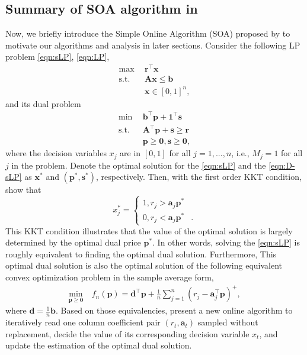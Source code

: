 \documentclass{article} %
\begin{document}
\subsection{Summary of SOA algorithm in \cite{li2020simple}}
\label{sec:soa}
Now, we briefly introduce the Simple Online Algorithm (SOA) proposed by  \cite{li2020simple} to motivate our algorithms and analysis in later sections. Consider the following LP problem \eqref{eqn:sLP}, \eqref{eqn:LP},
\begin{align}
   \tag{sLP} \max \ \ & \bm{r}^\top \bm{x} \label{eqn:sLP}  \\
    \text{s.t. }\ & \bm{A} \bm{x} \le \bm{b} \nonumber  \\ 
    & \bm{x} \in [0,1]^{n},  \nonumber
\end{align}
and its dual problem
\begin{align}
  \tag{D-sLP}  \min \ \ & \bm{b}^\top \bm{p} + \bm{1}^\top \bm{s} \label{eqn:D-sLP}  \\
    \text{s.t. }\ &  \bm{A}^\top \bm{p} + \bm{s} \ge \bm{r} \nonumber  \\ 
    & \bm{p} \ge \bm{0}, \bm{s}\ge \bm{0}, \nonumber
\end{align}
where the decision variables $x_j$ are in $[0,1]$ for all $j=1,...,n$, i.e., $M_j=1$ for all $j$ in the problem. Denote the optimal solution for the \eqref{eqn:sLP} and the \eqref{eqn:D-sLP} as $\bm{x}^*$ and $(\bm{p}^*,\bm{s}^*)$, respectively. Then, with the first order KKT condition, \cite{li2020simple} show that
\begin{equation}
\label{SOA_dec}
    x^*_j
    =
    \left\{
    \begin{matrix}
    1, r_j>\bm{a}_j\bm{p}^*& \\
    0,  r_j<\bm{a}_j\bm{p}^*&.
    \end{matrix}
    \right.
\end{equation}
This KKT condition illustrates that the value of the optimal solution is largely determined by the optimal dual price $\bm{p}^*$. In other words, solving the \eqref{eqn:sLP} is roughly equivalent to finding the optimal dual solution. Furthermore, This optimal dual solution is also the optimal solution of the following equivalent convex optimization problem in the sample average form, 
\begin{align}
\label{SA}
\tag{SA} \min_{\bm{p}\geq\bm{0}}\ & f_n(\bm{p})  = \bm{d}^\top \bm{p} + \frac{1}{n} \sum_{j=1}^n \left(r_{j}-\bm{a}_{j}^\top \bm{p}\right)^+, \nonumber
\end{align}
where $\bm{d}=\frac{1}{n}\bm{b}$. Based on those equivalencies, \cite{li2020simple} present a new online algorithm to iteratively read one column coefficient pair $(r_t,\bm{a}_t)$ sampled without replacement, decide the value of its corresponding decision variable $x_t$, and update the estimation of the optimal dual solution.
\end{document}
